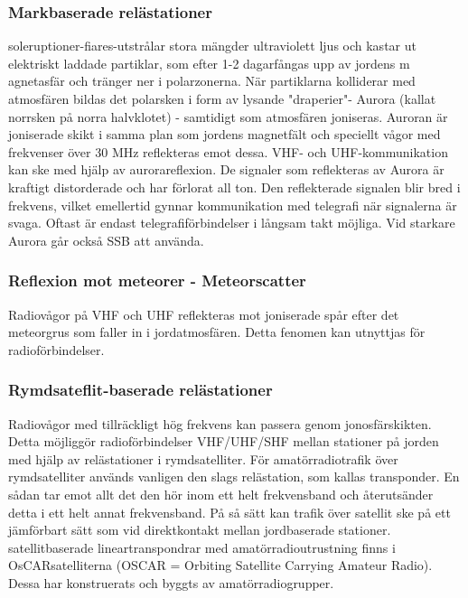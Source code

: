 \subsubsection{Markbaserade relästationer}

soleruptioner-fiares-utstrålar stora mängder ultraviolett ljus och kastar ut elektriskt
laddade partiklar, som efter 1-2 dagarfångas
upp av jordens m agnetasfär och tränger ner
i polarzonerna. När partiklarna kolliderar med
atmosfären bildas det polarsken i form av
lysande "draperier"- Aurora (kallat norrsken
på norra halvklotet) - samtidigt som atmosfären joniseras. Auroran är joniserade skikt
i samma plan som jordens magnetfält och
speciellt vågor med frekvenser över 30 MHz
reflekteras emot dessa.
VHF- och UHF-kommunikation kan ske
med hjälp av aurorareflexion. De signaler
som reflekteras av Aurora är kraftigt distorderade och har förlorat all ton. Den reflekterade signalen blir bred i frekvens, vilket emellertid gynnar kommunikation med telegrafi
när signalerna är svaga. Oftast är endast
telegrafiförbindelser i långsam takt möjliga.
Vid starkare Aurora går också SSB att använda.

\subsubsection{Reflexion mot meteorer - Meteorscatter}

Radiovågor på VHF och UHF reflekteras
mot joniserade spår efter det meteorgrus
som faller in i jordatmosfären. Detta fenomen kan utnyttjas för radioförbindelser.

\subsubsection{Rymdsateflit-baserade relästationer}

Radiovågor med tillräckligt hög frekvens kan
passera genom jonosfärskikten. Detta möjliggör radioförbindelser
VHF/UHF/SHF
mellan stationer på jorden med hjälp av relästationer i rymdsatelliter.
För amatörradiotrafik över rymdsatelliter
används vanligen den slags relästation, som
kallas transponder. En sådan tar emot allt
det den hör inom ett helt frekvensband och
återutsänder detta i ett helt annat frekvensband. På så sätt kan trafik över satellit ske på
ett jämförbart sätt som vid direktkontakt mellan jordbaserade stationer.
satellitbaserade lineartranspondrar med
amatörradioutrustning finns i OsCARsatelliterna (OSCAR = Orbiting Satellite
Carrying Amateur Radio). Dessa har konstruerats och byggts av amatörradiogrupper.

